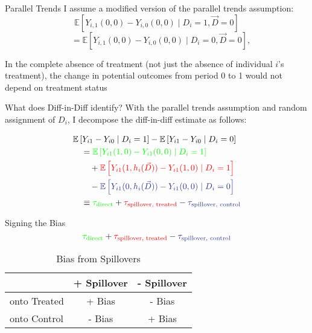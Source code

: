 \documentclass[aspectratio=43]{beamer}
\begin{document}
\begin{frame}{Parallel Trends}
    I assume a modified version of the parallel trends assumption: 
    \[
        \mathbb{E}\left[ Y_{i,1}(0, 0) - Y_{i,0}(0, 0) \mid D_i = 1, \vec{D} = 0 \right] 
    \] \[
        \quad =
        \mathbb{E}\left[ Y_{i,1}(0, 0) - Y_{i,0}(0, 0) \mid D_i = 0, \vec{D} = 0 \right],
    \]

    \vspace{5mm}
    In the complete absence of treatment (not just the absence of individual $i$'s treatment), the change in potential outcomes from period 0 to 1 would not depend on treatment status
    
\end{frame}

\begin{frame}{What does Diff-in-Diff identify?}
    With the parallel trends assumption and random assignment of $D_i$, I decompose the diff-in-diff estimate as follows: 
        
    \begin{align*}
        &\mathbb{E} \left[ Y_{i1} - Y_{i0} \mid D_i = 1 \right] - \mathbb{E} \left[ Y_{i1} - Y_{i0} \mid D_i = 0 \right] \\
        &\quad = 
        \textcolor{green}{\mathbb{E} \left[ Y_{i1}(1, 0) - Y_{i1}(0, 0) \mid D_i = 1 \right]} \\
        &\quad\quad + 
        \textcolor{red}{\mathbb{E} \left[ Y_{i1}(1, h_i(\vec{D})) - Y_{i1}(1, 0) \mid D_i = 1 \right]} \\ 
        &\quad\quad - 
        \textcolor{purple}{\mathbb{E} \left[ Y_{i1}(0, h_i(\vec{D})) - Y_{i1}(0, 0) \mid D_i = 0 \right]} \\
        &\quad \equiv \textcolor{green}{\tau_{\text{direct}}} + \textcolor{red}{\tau_{\text{spillover, treated}}} - \textcolor{purple}{\tau_{\text{spillover, control}}}
    \end{align*}

\end{frame}

\begin{frame}{Signing the Bias}
    \[ 
        \textcolor{green}{\tau_{\text{direct}}} + \textcolor{red}{\tau_{\text{spillover, treated}}} - \textcolor{purple}{\tau_{\text{spillover, control}}}    
    \]

    \begin{table}
        \caption{Bias from Spillovers}
        \begin{tabular}{|l|cc|}
            \hline
            & + Spillover & - Spillover \\ \hline
            onto Treated & + Bias & - Bias \\
            onto Control & - Bias & + Bias \\
            \hline
        \end{tabular}
    \end{table}
\end{frame}
\end{document}
